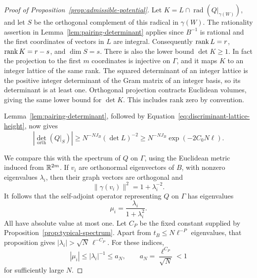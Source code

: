 \begin{proof}[Proof of Proposition~\ref{prop:admissible-potential}]
Let \(K=L\cap\operatorname{rad}(Q|_{\gamma(W)})\), and let \(S\)
be the orthogonal complement of this radical in \(\gamma(W)\).
The rationality assertion in Lemma~\ref{lem:pairing-determinant}
applies since \(B^{-1}\) is rational and the first coordinates
of vectors in \(L\) are integral. Consequently \(\operatorname{rank} L=r\),
\(\operatorname{rank} K=r-s\), and \(\dim S=s\). There is also the lower bound
\(\det K\ge1\). In fact the projection to the first \(m\)
coordinates is injective on \(\Gamma\), and it maps \(K\) to an
integer lattice of the same rank. The squared determinant of an
integer lattice is the positive integer determinant of the Gram
matrix of an integer basis, so its determinant is at least one.
Orthogonal projection contracts Euclidean volumes, giving the
same lower bound for \(\det K\). This includes rank zero by
convention.

Lemma~\ref{lem:pairing-determinant}, followed by
Equation~\eqref{eq:discriminant-lattice-height}, now gives
\begin{equation}\label{eq:discriminant-det-lower}
 \left|\det_{\mathrm{orth}}(Q|_S)\right|
 \ge N^{-NJ_B}(\det L)^{-2}
 \ge N^{-NJ_B}\exp(-2C_0N\ell).
\end{equation}

We compare this with the spectrum of \(Q\) on \(\Gamma\), using
the Euclidean metric induced from \(\mathbb R^{2m}\). If \(v_i\) are
orthonormal eigenvectors of \(B\), with nonzero eigenvalues
\(\lambda_i\), then their graph vectors are orthogonal and
\[
 \|\gamma(v_i)\|^2=1+\lambda_i^{-2}.
\]
It follows that the self-adjoint operator representing \(Q\)
on \(\Gamma\) has eigenvalues
\[
 \mu_i=\frac{\lambda_i}{1+\lambda_i^2}.
\]
All have absolute value at most one. Let \(C_P\) be the fixed
constant supplied by Proposition~\ref{prop:typical-spectrum}.
Apart from \(t_B\le N\ell^{-P}\) eigenvalues, that proposition
gives \(|\lambda_i|>\sqrt N\,\ell^{-C_P}\). For these indices,
\[
 |\mu_i|\le|\lambda_i|^{-1}\le a_N,\qquad
 a_N=\frac{\ell^{C_P}}{\sqrt N}<1
\]
for sufficiently large \(N\).


\end{proof}
